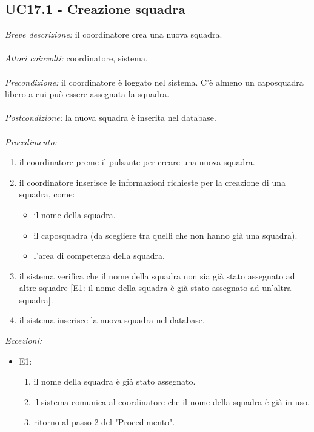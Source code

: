 \subsection{UC17.1 - Creazione squadra}
\textit{Breve descrizione:} il coordinatore crea una nuova squadra. 
\\
\\
\textit{Attori coinvolti:} coordinatore, sistema.
\\
\\
\textit{Precondizione:} il coordinatore è loggato nel sistema.
C'è almeno un caposquadra libero a cui può essere assegnata la squadra.
\\
\\
\textit{Postcondizione:} la nuova squadra è inserita nel database.
\\
\\
\textit{Procedimento:}
\begin{enumerate}
	\item il coordinatore preme il pulsante per creare una nuova squadra.
	\item il coordinatore inserisce le informazioni richieste per la creazione di una squadra, come:
	\begin{itemize}
		\item il nome della squadra.
		\item il caposquadra (da scegliere tra quelli che non hanno già una squadra).
		\item l'area di competenza della squadra.
	\end{itemize}
	\item il sistema verifica che il nome della squadra non sia già stato assegnato ad altre squadre [E1: il nome della squadra è già stato assegnato ad un'altra squadra].
	\item il sistema inserisce la nuova squadra nel database. 
\end{enumerate}

\textit{Eccezioni:}
\begin{itemize}
	\item E1:
	\begin{enumerate}
		\item il nome della squadra è già stato assegnato.
		\item il sistema comunica al coordinatore che il nome della squadra è già in uso.
		\item ritorno al passo 2 del "Procedimento".
	\end{enumerate}
\end{itemize}



